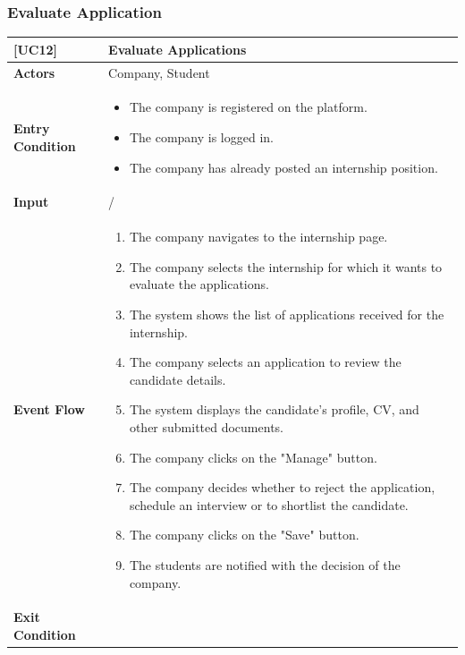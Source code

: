 \subsubsection*{Evaluate Application}
\begin{table}[H]
    \centering
    \renewcommand{\arraystretch}{1.5}
    \begin{tabular}{|p{4cm}|p{11cm}|}
    \hline
    \rowcolor{bluepoli!40}
    \textbf{[UC12]} & \textbf{Evaluate Applications} \\ \hline \hline
    \textbf{Actors} & Company, Student \\ \hline
    \textbf{Entry Condition} & 
    {\setlength{\leftmargini}{1.1em}
    \begin{itemize}
        \item The company is registered on the platform.
        \item The company is logged in.
        \item The company has already posted an internship position.
    \end{itemize}} \\ \hline
    \textbf{Input} & / \\ \hline
    \textbf{Event Flow} & 
    {\setlength{\leftmargini}{1.4em}
    \begin{enumerate}
        \item The company navigates to the internship page.
        \item The company selects the internship for which it wants to evaluate the applications.
        \item The system shows the list of applications received for the internship.
        \item The company selects an application to review the candidate details.
        \item The system displays the candidate's profile, CV, and other submitted documents.
        \item The company clicks on the "Manage" button.
        \item The company decides whether to reject the application, schedule an interview or to shortlist the candidate.
        \item The company clicks on the "Save" button.
        \item The students are notified with the decision of the company.
    \end{enumerate}} \\ \hline
    \textbf{Exit Condition} & 
    {\setlength{\leftmargini}{1.1em}
}
\end{tabular}
\end{table}
